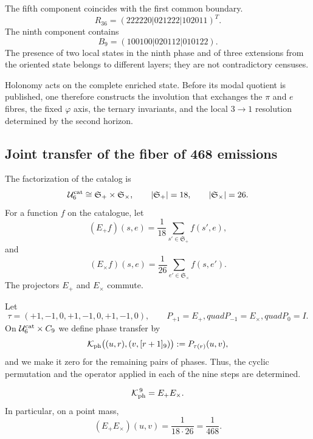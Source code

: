 The fifth component coincides with the first common boundary.
\[
 R_{36}=(222220|021222|102011)^T.
\]
The ninth component contains
\[
 B_9=(100100|020112|010122).
\]
The presence of two local states in the ninth phase and of three extensions
from the oriented state belongs to different layers; they are not contradictory
censuses.

Holonomy acts on the complete enriched state. Before its modal
quotient is published, one therefore constructs the involution that exchanges
the \(\pi\) and \(e\) fibres, the fixed \(\varphi\) axis, the ternary
invariants, and the local \(3\to1\) resolution determined by the second
horizon.

\begin{HMTScientificOwnerSubordinated}

\end{HMTScientificOwnerSubordinated}

\subsection{Joint transfer of the fiber of 468 emissions}

The factorization of the catalog is
\[
 \mathcal U_6^{\rm cat}\cong
 \mathfrak S_+\times\mathfrak S_\times,
 \qquad
 |\mathfrak S_+|=18,\qquad |\mathfrak S_\times|=26.
\]
For a function \(f\) on the catalogue, let
\[
 (E_+f)(s,e)=\frac1{18}\sum_{s'\in\mathfrak S_+}f(s',e),
\]
and
\[
 (E_\times f)(s,e)=\frac1{26}
 \sum_{e'\in\mathfrak S_\times}f(s,e').
\]
The projectors \(E_+\) and \(E_\times\) commute.

Let
\[
 \tau=(+1,-1,0,+1,-1,0,+1,-1,0),
 \qquad
 P_{+1}=E_+,quad P_{-1}=E_\times,quad P_0=I.
\]
On \(\mathcal U_6^{\rm cat}\times C_9\) we define phase transfer
by
\begin{equation}
 \mathcal K_{\rm ph}\bigl((u,r),(v,[r+1]_9)\bigr)
 :=P_{\tau(r)}(u,v),
 \label{p12-83-c7-s1:eq:u009-kph-explicita}
\end{equation}
and we make it zero for the remaining pairs of phases. Thus, the cyclic permutation
and the operator applied in each of the nine steps are determined.

\begin{proposition}
\label{p12-83-c7-s1:prop:transferencia-conjunta-nueve}
\[
 \mathcal K_{\rm ph}^{\,9}=E_+E_\times.
\]
In particular, on a point mass,
\[
 (E_+E_\times)(u,v)=\frac1{18\cdot26}=\frac1{468}.
\]
\end{proposition}

